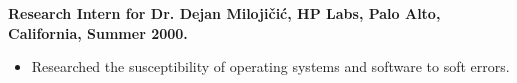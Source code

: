 \documentclass[10pt]{article}
\begin{document}


{\bf Research Intern for Dr. Dejan Miloji\v{c}i\'c, HP Labs, Palo Alto, California, Summer 2000.}
\begin{itemize}
\vspace{-5pt}
\item
Researched the susceptibility of operating systems and software to soft errors.
\end{itemize}







\end{document}

